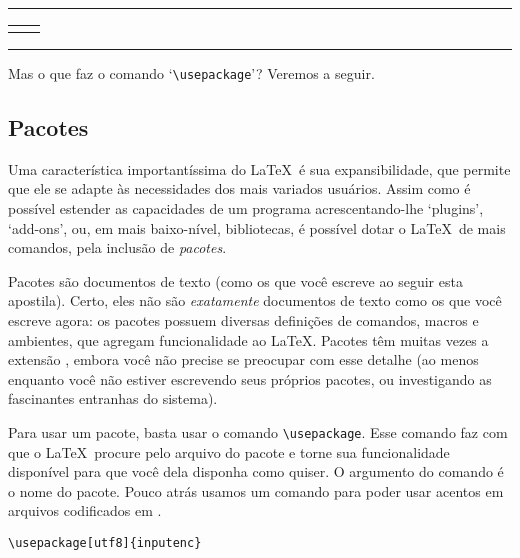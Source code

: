 \medskip
\begin{center}\hrule\smallskip
\begin{tabular}{c|c}
\begin{minipage}{.405\textwidth}\footnotesize

\end{minipage} &
\begin{minipage}{.535\textwidth}

\end{minipage}
\end{tabular}
\smallskip\hrule
\end{center}
\medskip


Mas o que faz o comando `\verb'\usepackage''? Veremos a seguir.

\subsection{Pacotes}

Uma característica importantíssima do \LaTeX\  é sua
expansibilidade, que permite que ele se adapte às necessidades
dos mais variados usuários. Assim como é possível estender as
capacidades de um programa acrescentando-lhe `plugins', `add-ons', ou,
em mais baixo-nível, bibliotecas, é possível dotar o \LaTeX\ de mais
comandos, pela inclusão de \emph{pacotes}.

Pacotes são documentos de texto (como os que você escreve ao seguir
esta apostila). Certo, eles não são \emph{exatamente} documentos de
texto como os que você escreve agora: os pacotes possuem diversas
definições de comandos, macros e ambientes, que agregam funcionalidade
ao \LaTeX. Pacotes têm muitas vezes a extensão , embora
você não precise se preocupar com esse detalhe (ao menos enquanto você
não estiver escrevendo seus próprios pacotes, ou investigando as
fascinantes entranhas do sistema).

Para usar um pacote, basta usar o comando \verb'\usepackage'. Esse
comando faz com que o \LaTeX\ procure pelo arquivo do pacote e torne
sua funcionalidade disponível para que você dela disponha como quiser.
O argumento do comando é o nome do pacote. Pouco atrás usamos um
comando para poder usar acentos em arquivos codificados em .
\begin{center}\footnotesize
\begin{verbatim}
\usepackage[utf8]{inputenc}
\end{verbatim}
\end{center}


